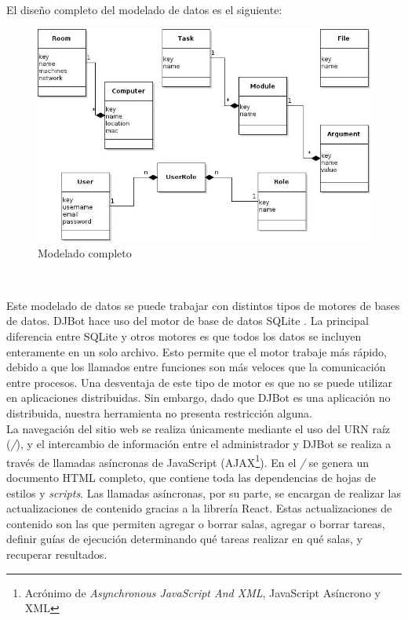\documentclass[a4paper,12pt]{article}
\begin{document}
El diseño completo del modelado de datos es el siguiente:\\

\begin{figure}[htb]
\centering
\includegraphics[width=.9\linewidth]{./img/database.jpg}
\caption{Modelado completo}
\end{figure}\\

\newpage

Este modelado de datos se puede trabajar con distintos tipos de motores de bases de datos. DJBot hace uso del motor de base de datos SQLite \cite{SQLite}. La principal diferencia entre SQLite y otros motores es que todos los datos se incluyen enteramente en un solo archivo. Esto permite que el motor trabaje más rápido, debido a que los llamados entre funciones son más veloces que la comunicación entre procesos. Una desventaja de este tipo de motor es que no se puede utilizar en aplicaciones distribuidas. Sin embargo, dado que DJBot es una aplicación no distribuida, nuestra herramienta no presenta restricción alguna.\\

La navegación del sitio web se realiza únicamente mediante el uso del URN raíz (\emph{/}), y el intercambio de información entre el administrador y DJBot se realiza a través de llamadas asíncronas de JavaScript (AJAX\footnote{Acrónimo de \emph{Asynchronous JavaScript And XML}, JavaScript Asíncrono y XML}). En el \emph{/} se genera un documento HTML completo, que contiene toda las dependencias de hojas de estilos y \emph{scripts}. Las llamadas asíncronas, por su parte, se encargan de realizar las actualizaciones de contenido gracias a la librería React. Estas actualizaciones de contenido son las que permiten agregar o borrar salas, agregar o borrar tareas, definir guías de ejecución determinando qué tareas realizar en qué salas, y recuperar resultados.\\
\end{document}
